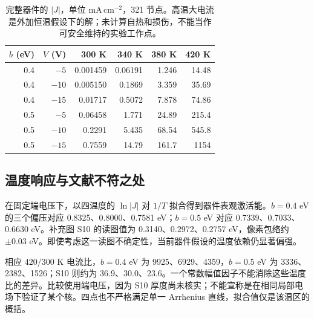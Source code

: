 \begin{table}[htbp]\centering\small
\begin{tabular}{rrrrrr}\toprule
$b$ (eV)&$V$ (V)&300 K&340 K&380 K&420 K\\\midrule
0.4&$-5$&0.001459&0.06191&1.246&14.48\\
0.4&$-10$&0.005150&0.1869&3.359&35.69\\
0.4&$-15$&0.01717&0.5072&7.878&74.86\\
0.5&$-5$&0.06458&1.771&24.89&215.4\\
0.5&$-10$&0.2291&5.435&68.54&545.8\\
0.5&$-15$&0.7559&14.79&161.7&1154\\\bottomrule
\end{tabular}
\caption{{\cjkfont 完整器件的}\allowbreak{} $|J|${\cjkfont ，单位}\allowbreak{} $\mathrm{mA\,cm^{-2}}${\cjkfont ，}\allowbreak{}321 {\cjkfont 节点。高温大电流是外加恒温假设下的解；未计算自热和损伤，不能当作可安全维持的实验工作点。}\allowbreak{}}
\end{table}

\subsection{{\cjkfont 温度响应与文献不符之处}\allowbreak{}}
{\cjkfont 在固定端电压下，以四温度的}\allowbreak{} $\ln|J|$ {\cjkfont 对}\allowbreak{} $1/T$ {\cjkfont 拟合得到器件表观激活能。}\allowbreak{}$b=0.4$ eV {\cjkfont 的三个偏压对应}\allowbreak{} 0.8325{\cjkfont 、}\allowbreak{}0.8000{\cjkfont 、}\allowbreak{}0.7581 eV{\cjkfont ；}\allowbreak{}$b=0.5$ eV {\cjkfont 对应}\allowbreak{} 0.7339{\cjkfont 、}\allowbreak{}0.7033{\cjkfont 、}\allowbreak{}0.6630 eV{\cjkfont 。补充图}\allowbreak{} S10 {\cjkfont 的读图值为}\allowbreak{} 0.3140{\cjkfont 、}\allowbreak{}0.2972{\cjkfont 、}\allowbreak{}0.2757 eV{\cjkfont ，像素包络约}\allowbreak{} $\pm0.03$ eV{\cjkfont 。即使考虑这一读图不确定性，当前器件假设的温度依赖仍显著偏强。}\allowbreak{}

{\cjkfont 相应}\allowbreak{} $420/300$ K {\cjkfont 电流比，}\allowbreak{}$b=0.4$ eV {\cjkfont 为}\allowbreak{} 9925{\cjkfont 、}\allowbreak{}6929{\cjkfont 、}\allowbreak{}4359{\cjkfont ，}\allowbreak{}$b=0.5$ eV {\cjkfont 为}\allowbreak{} 3336{\cjkfont 、}\allowbreak{}2382{\cjkfont 、}\allowbreak{}1526{\cjkfont ；}\allowbreak{}S10 {\cjkfont 则约为}\allowbreak{} 36.9{\cjkfont 、}\allowbreak{}30.0{\cjkfont 、}\allowbreak{}23.6{\cjkfont 。一个常数幅值因子不能消除这些温度比的差异。比较使用端电压，因为}\allowbreak{} S10 {\cjkfont 厚度尚未核实；不能宣称是在相同局部电场下验证了某个核。四点也不严格满足单一}\allowbreak{} Arrhenius {\cjkfont 直线，拟合值仅是该温区的概括。}\allowbreak{}

